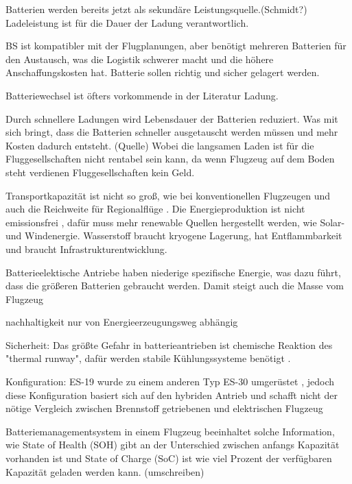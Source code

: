 Batterien werden bereits jetzt als sekundäre Leistungsquelle.(Schmidt?)
Ladeleistung ist für die Dauer der Ladung verantwortlich. 

BS ist kompatibler mit der Flugplanungen, aber benötigt mehreren Batterien für den Austausch, was die Logistik schwerer macht 
und die höhere Anschaffungskosten hat. Batterie sollen richtig und sicher gelagert werden. \cite{salucci2020optimal}

Batteriewechsel ist öfters vorkommende in der Literatur Ladung.

Durch schnellere Ladungen wird Lebensdauer der Batterien reduziert. Was mit sich bringt, dass die Batterien schneller ausgetauscht werden müssen
und mehr Kosten dadurch entsteht. (Quelle) Wobei die langsamen Laden ist für die Fluggesellschaften nicht rentabel sein kann, 
da wenn Flugzeug auf dem Boden steht verdienen Fluggesellschaften kein Geld.

Transportkapazität ist nicht so groß, wie bei konventionellen Flugzeugen und auch die Reichweite für Regionalflüge \cite{abrantes2024impact}.
Die Energieproduktion ist nicht emissionsfrei \cite{abrantes2024impact}, dafür muss mehr renewable Quellen hergestellt werden, 
wie Solar- und Windenergie. Wasserstoff braucht kryogene Lagerung, hat Entflammbarkeit und braucht 
Infrastrukturentwicklung.\cite{abrantes2024impact}

Batterieelektische Antriebe haben niederige spezifische Energie, was dazu führt, dass die größeren Batterien gebraucht werden. Damit steigt auch
die Masse vom Flugzeug

nachhaltigkeit nur von Energieerzeugungsweg abhängig

Sicherheit: Das größte Gefahr in batterieantrieben ist chemische Reaktion des "thermal runway", dafür werden stabile
Kühlungssysteme benötigt \cite{donckers2024electric}.

Konfiguration: ES-19 wurde zu einem anderen Typ ES-30 umgerüstet \cite{donckers2024electric}, jedoch diese Konfiguration basiert 
sich auf den hybriden Antrieb und schafft nicht der nötige Vergleich zwischen Brennstoff getriebenen und elektrischen Flugzeug

Batteriemanagementsystem in einem Flugzeug beeinhaltet solche Information, wie State of Health (SOH) gibt an der Unterschied zwischen anfangs Kapazität vorhanden ist und 
State of Charge (SoC) ist wie viel Prozent der verfügbaren Kapazität geladen werden kann. (umschreiben) \cite{donckers2024electric}